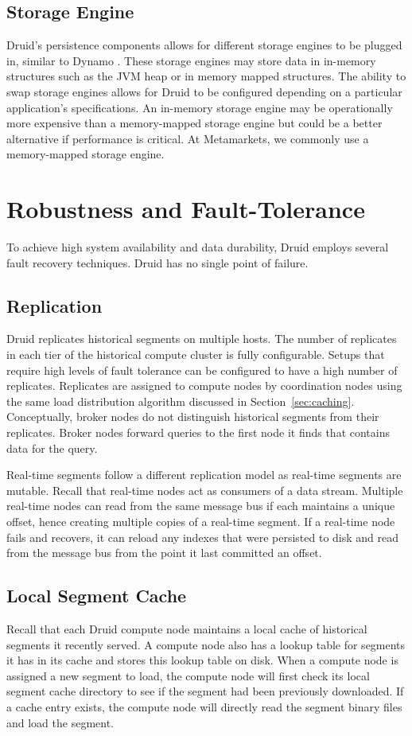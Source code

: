 \documentclass{vldb}
\begin{document}
\subsection{Storage Engine}
Druid’s persistence components allows for different storage engines to
be plugged in, similar to Dynamo \cite{decandia2007dynamo}. These storage engines may store
data in in-memory structures such as the JVM heap or in memory mapped
structures. The ability to swap storage engines allows for Druid to be
configured depending on a particular application’s specifications. An
in-memory storage engine may be operationally more expensive than a
memory-mapped storage engine but could be a better alternative if
performance is critical. At Metamarkets, we commonly use a
memory-mapped storage engine.

\section{Robustness and Fault-Tolerance}
\label{sec:robustness}
To achieve high system availability and data durability, Druid employs
several fault recovery techniques. Druid has no single point of
failure.

\subsection{Replication}
Druid replicates historical segments on multiple hosts. The number of
replicates in each tier of the historical compute cluster is fully
configurable. Setups that require high levels of fault tolerance can
be configured to have a high number of replicates. Replicates are
assigned to compute nodes by coordination nodes using the same load
distribution algorithm discussed in Section~\ref{sec:caching}. Conceptually,
broker nodes do not distinguish historical segments from their
replicates. Broker nodes forward queries to the first node it finds
that contains data for the query.

Real-time segments follow a different replication model as real-time
segments are mutable. Recall that real-time nodes act as consumers of
a data stream. Multiple real-time nodes can read from the same message
bus if each maintains a unique offset, hence creating multiple copies
of a real-time segment. If a real-time node fails and recovers, it can
reload any indexes that were persisted to disk and read from the
message bus from the point it last committed an offset.

\subsection{Local Segment Cache}
Recall that each Druid compute node maintains a local cache of
historical segments it recently served. A compute node also has a
lookup table for segments it has in its cache and stores this lookup
table on disk. When a compute node is assigned a new segment to load,
the compute node will first check its local segment cache directory to
see if the segment had been previously downloaded. If a cache entry
exists, the compute node will directly read the segment binary files
and load the segment.
\end{document}
